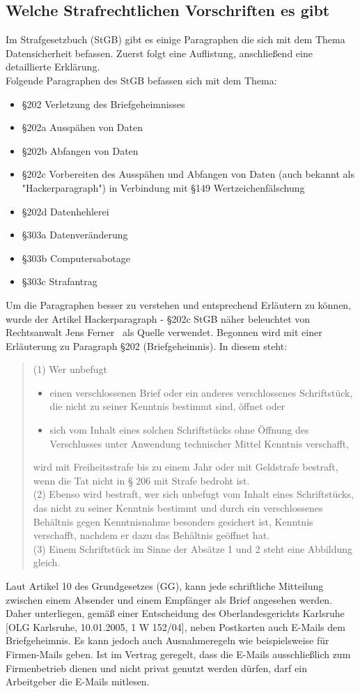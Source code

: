 \documentclass[10pt,a4paper]{article}
\begin{document}
\subsection*{Welche Strafrechtlichen Vorschriften es gibt}
Im Strafgesetzbuch (StGB) gibt es einige Paragraphen die sich mit dem Thema Datensicherheit befassen. Zuerst folgt eine Auflistung, anschließend eine detaillierte Erklärung. \\

Folgende Paragraphen des StGB befassen sich mit dem Thema:
\begin{itemize}
	\item §202 Verletzung des Briefgeheimnisses
	\item §202a Ausspähen von Daten
	\item §202b Abfangen von Daten
	\item §202c Vorbereiten des Ausspähen und Abfangen von Daten (auch bekannt als "Hackerparagraph") in Verbindung mit §149 Wertzeichenfälschung
	\item §202d Datenhehlerei
	\item §303a Datenveränderung
	\item §303b Computersabotage
	\item §303c Strafantrag 
\end{itemize}
Um die Paragraphen besser zu verstehen und entsprechend Erläutern zu können, wurde der Artikel \glqq Hackerparagraph - §202c StGB näher beleuchtet\grqq{} von Rechtsanwalt Jens Ferner~\cite{InternetStrafrecht} als Quelle verwendet. Begonnen wird mit einer Erläuterung zu Paragraph §202 (Briefgeheimnis). In diesem steht:
\begin{quote}
(1) Wer unbefugt
\begin{itemize}
	\item[1.] einen verschlossenen Brief oder ein anderes verschlossenes Schriftstück, die nicht zu seiner Kenntnis bestimmt sind, öffnet oder
	\item[2.] sich vom Inhalt eines solchen Schriftstücks ohne Öffnung des Verschlusses unter Anwendung technischer Mittel Kenntnis verschafft,
\end{itemize}
wird mit Freiheitsstrafe bis zu einem Jahr oder mit Geldstrafe bestraft, wenn die Tat nicht in § 206 mit Strafe bedroht ist.\\
(2) Ebenso wird bestraft, wer sich unbefugt vom Inhalt eines Schriftstücks, das nicht zu seiner Kenntnis bestimmt und durch ein verschlossenes Behältnis gegen Kenntnisnahme besonders gesichert ist, Kenntnis verschafft, nachdem er dazu das Behältnis geöffnet hat.\\
(3) Einem Schriftstück im Sinne der Absätze 1 und 2 steht eine Abbildung gleich.
\end{quote}
Laut Artikel 10 des Grundgesetzes (GG), kann jede schriftliche Mitteilung zwischen einem Absender und einem Empfänger als Brief angesehen werden. Daher unterliegen, gemäß einer Entscheidung des Oberlandesgerichts Karlsruhe [OLG Karlsruhe, 10.01.2005, 1 W 152/04], neben Postkarten auch E-Mails dem Briefgeheimnis. Es kann jedoch auch Ausnahmeregeln wie beispielsweise für Firmen-Mails geben. Ist im Vertrag geregelt, dass die E-Mails ausschließlich zum Firmenbetrieb dienen und nicht privat genutzt werden dürfen, darf ein Arbeitgeber die E-Mails mitlesen.
\end{document}
